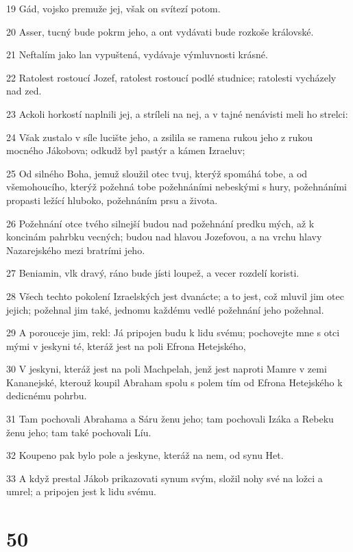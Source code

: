 \par 19 Gád, vojsko premuže jej, však on svítezí potom.
\par 20 Asser, tucný bude pokrm jeho, a ont vydávati bude rozkoše královské.
\par 21 Neftalím jako lan vypuštená, vydávaje výmluvnosti krásné.
\par 22 Ratolest rostoucí Jozef, ratolest rostoucí podlé studnice; ratolesti vycházely nad zed.
\par 23 Ackoli horkostí naplnili jej, a stríleli na nej, a v tajné nenávisti meli ho strelci:
\par 24 Však zustalo v síle lucište jeho, a zsilila se ramena rukou jeho z rukou mocného Jákobova; odkudž byl pastýr a kámen Izraeluv;
\par 25 Od silného Boha, jemuž sloužil otec tvuj, kterýž spomáhá tobe, a od všemohoucího, kterýž požehná tobe požehnáními nebeskými s hury, požehnáními propasti ležící hluboko, požehnáním prsu a života.
\par 26 Požehnání otce tvého silnejší budou nad požehnání predku mých, až k koncinám pahrbku vecných; budou nad hlavou Jozefovou, a na vrchu hlavy Nazarejského mezi bratrími jeho.
\par 27 Beniamin, vlk dravý, ráno bude jísti loupež, a vecer rozdelí koristi.
\par 28 Všech techto pokolení Izraelských jest dvanácte; a to jest, což mluvil jim otec jejich; požehnal jim také, jednomu každému vedlé požehnání jeho požehnal.
\par 29 A porouceje jim, rekl: Já pripojen budu k lidu svému; pochovejte mne s otci mými v jeskyni té, kteráž jest na poli Efrona Hetejského,
\par 30 V jeskyni, kteráž jest na poli Machpelah, jenž jest naproti Mamre v zemi Kananejské, kterouž koupil Abraham spolu s polem tím od Efrona Hetejského k dedicnému pohrbu.
\par 31 Tam pochovali Abrahama a Sáru ženu jeho; tam pochovali Izáka a Rebeku ženu jeho; tam také pochovali Líu.
\par 32 Koupeno pak bylo pole a jeskyne, kteráž na nem, od synu Het.
\par 33 A když prestal Jákob prikazovati synum svým, složil nohy své na ložci a umrel; a pripojen jest k lidu svému.

\chapter{50}

